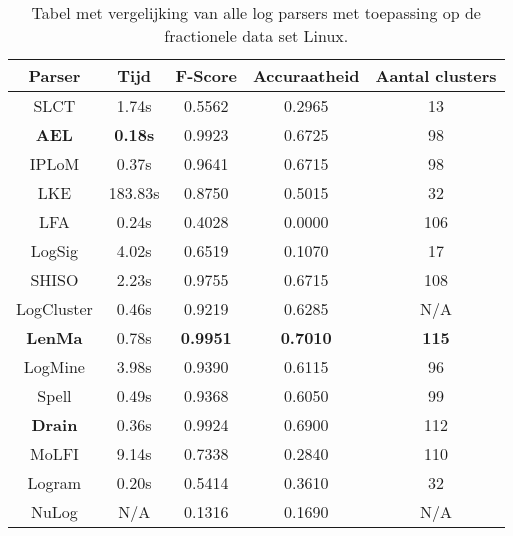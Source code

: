 \begin{table}[!htp]
    \caption{Tabel met vergelijking van alle log parsers met toepassing op de fractionele data set Linux.}
    \label{table:Linux}
    \begin{center}
        \begin{tabular}{||c | c | c | c | c||} 
            \hline
            Parser & Tijd & F-Score & Accuraatheid & Aantal clusters \\ [0.5ex] 
            \hline\hline
            SLCT & 1.74s & 0.5562 & 0.2965 & 13 \\
            
            \textbf{AEL} & \textbf{0.18s} & 0.9923 & 0.6725 & 98 \\ 
            
            IPLoM & 0.37s & 0.9641 & 0.6715 & 98 \\
            
            LKE & 183.83s & 0.8750 & 0.5015 & 32 \\
            
            LFA & 0.24s & 0.4028 & 0.0000 & 106 \\
            
            LogSig & 4.02s & 0.6519 & 0.1070 & 17 \\
            
            SHISO & 2.23s & 0.9755 & 0.6715 & 108 \\
            
            LogCluster & 0.46s & 0.9219 & 0.6285 & N/A \\
            
            \textbf{LenMa} & 0.78s & \textbf{0.9951} & \textbf{0.7010} & \textbf{115} \\
            
            LogMine & 3.98s & 0.9390 & 0.6115 & 96 \\
            
            Spell & 0.49s & 0.9368 & 0.6050 & 99 \\
            
            \textbf{Drain} & 0.36s & 0.9924 & 0.6900 & 112 \\
            
            MoLFI & 9.14s & 0.7338 & 0.2840 & 110 \\
            
            Logram & 0.20s & 0.5414 & 0.3610 & 32 \\
            
            NuLog & N/A & 0.1316 & 0.1690 & N/A \\
            \hline
        \end{tabular}
    \end{center}
\end{table}

